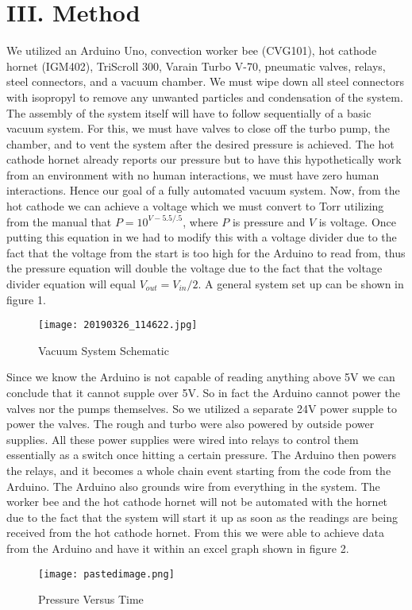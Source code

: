 \documentclass[aps,prl,twocolumn,showpacs,superscriptaddress,groupedaddress]{revtex4}  %
\begin{document}
\section{\label{sec: level3}III. Method}
We utilized an Arduino Uno, convection worker bee (CVG101), hot cathode hornet (IGM402), TriScroll 300, Varain Turbo V-70, pneumatic valves, relays, steel connectors, and a vacuum chamber. We must wipe down all steel connectors with isopropyl to remove any unwanted particles and condensation of the system. The assembly of the system itself will have to follow sequentially of a basic vacuum system. For this, we must have valves to close off the turbo pump, the chamber, and to vent the system after the desired pressure is achieved. The hot cathode hornet already reports our pressure but to have this hypothetically work from an environment with no human interactions, we must have zero human interactions. Hence our goal of a fully automated vacuum system. Now, from the hot cathode we can achieve a voltage which we must convert to Torr utilizing from the manual that $P = 10^{V-5.5/.5}$, where $P$ is pressure and $V$ is voltage. Once putting this equation in we had to modify this with a voltage divider due to the fact that the voltage from the start is too high for the Arduino to read from, thus the pressure equation will double the voltage due to the fact that the voltage divider equation will equal $V_{out}=V_{in}/2$. A general system set up can be shown in figure 1.

 \begin{figure}[htbp] %
   \centering
   \texttt{[image: 20190326\_114622.jpg]} 
   \caption{Vacuum System Schematic}
   \label{fig:example}
\end{figure}
Since we know the Arduino is not capable of reading anything above 5V we can conclude that it cannot supple over 5V. So in fact the Arduino cannot power the valves nor the pumps themselves. So we utilized a separate 24V power supple to power the valves. The rough and turbo were also powered by outside power supplies. All these power supplies were wired into relays to control them essentially as a switch once hitting a certain pressure. The Arduino then powers the relays, and it becomes a whole chain event starting from the code from the Arduino. The Arduino also grounds wire from everything in the system. The worker bee and the hot cathode hornet will not be automated with the hornet due to the fact that the system will start it up as soon as the readings are being received from the hot cathode hornet. 
From this we were able to achieve data from the Arduino and have it within an excel graph shown in figure 2.
\begin{figure}[htbp] %
   \centering
   \texttt{[image: pastedimage.png]} 
   \caption{Pressure Versus Time}
   \label{fig:example}
\end{figure}
\end{document}
